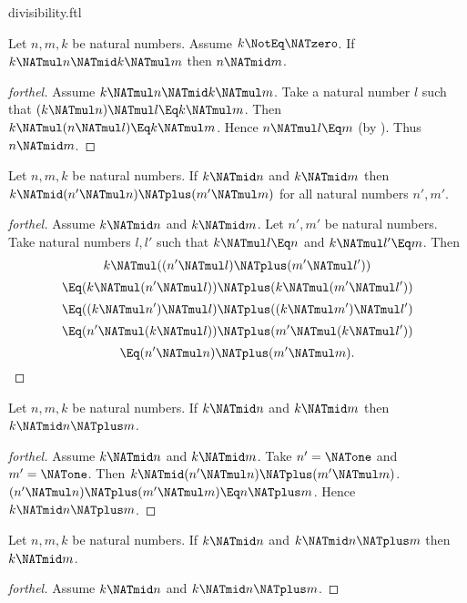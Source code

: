 \documentclass{stex}
\begin{document}
\begin{smodule}{divisibility.ftl}
\begin{proposition}[forthel,id=ARITHMETIC_07_6469492028735488]
  Let $n, m, k$ be natural numbers.
  Assume $k \NotEq \NATzero$.
  If $k \NATmul n \NATmid k \NATmul m$ then $n \NATmid m$.
\end{proposition}
\begin{proof}[forthel]
  Assume $k \NATmul n \NATmid k \NATmul m$.
  Take a natural number $l$ such that $(k \NATmul n) \NATmul l \Eq k \NATmul m$.
  Then $k \NATmul (n \NATmul l) \Eq k \NATmul m$.
  Hence $n \NATmul l \Eq m$ (by ).
  Thus $n \NATmid m$.
\end{proof}

\begin{proposition}[forthel,id=ARITHMETIC_07_4700711333920768]
  Let $n, m, k$ be natural numbers.
  If $k \NATmid n$ and $k \NATmid m$ then $k \NATmid (n' \NATmul n) \NATplus (m' \NATmul m)$
  for all natural numbers $n', m'$.
\end{proposition}
\begin{proof}[forthel]
  Assume $k \NATmid n$ and $k \NATmid m$.
  Let $n', m'$ be natural numbers.
  Take natural numbers $l,l'$ such that $k \NATmul l \Eq n$ and $k \NATmul l' \Eq m$.
  Then
  \[  k \NATmul ((n' \NATmul l) \NATplus (m' \NATmul l'))                \]
  \[    \Eq (k \NATmul (n' \NATmul l)) \NATplus (k \NATmul (m' \NATmul l'))  \]
  \[    \Eq ((k \NATmul n') \NATmul l) \NATplus ((k \NATmul m') \NATmul l')  \]
  \[    \Eq (n' \NATmul (k \NATmul l)) \NATplus (m' \NATmul (k \NATmul l'))  \]
  \[    \Eq (n' \NATmul n) \NATplus (m' \NATmul m).                      \]
\end{proof}

\begin{corollary}[forthel,id=ARITHMETIC_07_1556786209357824]
  Let $n, m, k$ be natural numbers.
  If $k \NATmid n$ and $k \NATmid m$ then $k \NATmid n \NATplus m$.
\end{corollary}
\begin{proof}[forthel]
  Assume $k \NATmid n$ and $k \NATmid m$.
  Take $n' = \NATone$ and $m' = \NATone$.
  Then $k \NATmid (n' \NATmul n) \NATplus (m' \NATmul m)$.
  $(n' \NATmul n) \NATplus (m' \NATmul m) \Eq n \NATplus m$.
  Hence $k \NATmid n \NATplus m$.
\end{proof}

\begin{proposition}[forthel,id=ARITHMETIC_07_1076947887063040]
  Let $n, m, k$ be natural numbers.
  If $k \NATmid n$ and $k \NATmid n \NATplus m$ then $k \NATmid m$.
\end{proposition}
\begin{proof}[forthel]
  Assume $k \NATmid n$ and $k \NATmid n \NATplus m$.


\end{proof}
\end{smodule}
\end{document}
